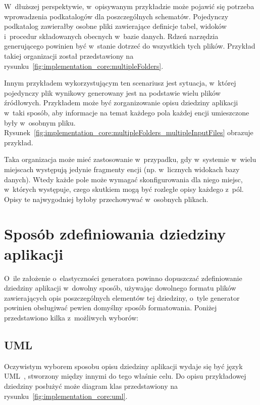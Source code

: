 W~dłuższej perspektywie, w~opisywanym przykładzie może pojawić się potrzeba wprowadzenia podkatalogów dla poszczególnych schematów.
Pojedynczy podkatalog zawierałby osobne pliki zawierające definicje tabel, widoków i~procedur składowanych obecnych w~bazie danych.
Rdzeń narzędzia generującego powinien być w~stanie dotrzeć do wszystkich tych plików.
Przykład takiej organizacji został przedstawiony na rysunku~\ref{fig:implementation_core:multipleFolders}.



Innym przykładem wykorzystującym ten scenariusz jest sytuacja, w~której pojedynczy plik wynikowy generowany jest na podstawie wielu plików źródłowych.
Przykładem może być zorganizowanie opisu dziedziny aplikacji w~taki sposób, aby informacje na temat każdego pola każdej encji umieszczone były w~osobnym pliku.
Rysunek~\ref{fig:implementation_core:multipleFolders_multipleInputFiles} obrazuje przykład.



Taka organizacja może mieć zastosowanie w~przypadku, gdy w~systemie w~wielu miejscach występują jedynie fragmenty encji (np. w~licznych widokach bazy danych).
Wtedy każde pole może wymagać skonfigurowania dla niego miejsc, w~których występuje, czego skutkiem mogą być rozległe opisy każdego z~pól.
Opisy te najwygodniej byłoby przechowywać w~osobnych plikach.



\section{Sposób zdefiniowania dziedziny aplikacji} \label{sec:core:domain_definition}

O~ile założenie o~elastyczności generatora powinno dopuszczać zdefiniowanie dziedziny aplikacji w~dowolny sposób, używając dowolnego formatu plików zawierających opis poszczególnych elementów tej dziedziny, o~tyle generator powinien obsługiwać pewien domyślny sposób formatowania.
Poniżej przedstawiono kilka z~możliwych wyborów:

\subsection{UML}

Oczywistym wyborem sposobu opisu dziedziny aplikacji wydaje się być język UML~\cite{uml}, stworzony między innymi do tego właśnie celu.
Do opisu przykładowej dziedziny posłużyć może diagram klas przedstawiony na rysunku~\ref{fig:implementation_core:uml}.


